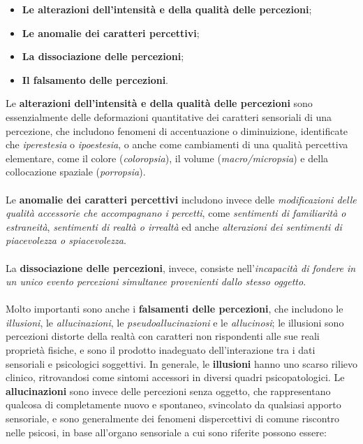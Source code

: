 \begin{itemize}
\item
  \textbf{Le alterazioni dell'intensità e della qualità delle
  percezioni};
\item
  \textbf{Le anomalie dei caratteri percettivi};
\item
  \textbf{La dissociazione delle percezioni};
\item
  \textbf{Il falsamento delle percezioni}.
\end{itemize}

Le \textbf{alterazioni dell'intensità e della qualità delle percezioni}
sono essenzialmente delle deformazioni quantitative dei caratteri
sensoriali di una percezione, che includono fenomeni di accentuazione o
diminuizione, identificate che \emph{iperestesia} o \emph{ipoestesia}, o
anche come cambiamenti di una qualità percettiva elementare, come il
colore (\emph{coloropsia}), il volume (\emph{macro/micropsia}) e della
collocazione spaziale (\emph{porropsia}).
\\\\
Le \textbf{anomalie dei caratteri percettivi} includono invece delle
\emph{modificazioni delle qualità accessorie che accompagnano i
percetti}, come \emph{sentimenti di familiarità o estraneità},
\emph{sentimenti di realtà o irrealtà} ed anche \emph{alterazioni dei
sentimenti di piacevolezza o spiacevolezza}.
\\\\
La \textbf{dissociazione delle percezioni}, invece, consiste
nell'\emph{incapacità di fondere in un unico evento percezioni
simultanee provenienti dallo stesso oggetto}.
\\\\
Molto importanti sono anche i \textbf{falsamenti delle percezioni}, che
includono le \emph{illusioni}, le \emph{allucinazioni}, le
\emph{pseudoallucinazioni} e le \emph{allucinosi}; le illusioni sono
percezioni distorte della realtà con caratteri non rispondenti alle sue
reali proprietà fisiche, e sono il prodotto inadeguato dell'interazione
tra i dati sensoriali e psicologici soggettivi. In generale, le
\textbf{illusioni} hanno uno scarso rilievo clinico, ritrovandosi come
sintomi accessori in diversi quadri psicopatologici. Le
\textbf{allucinazioni} sono invece delle percezioni senza oggetto, che
rappresentano qualcosa di completamente nuovo e spontaneo, svincolato da
qualsiasi apporto sensoriale, e sono generalmente dei fenomeni
dispercettivi di comune riscontro nelle psicosi, in base all'organo
sensoriale a cui sono riferite possono essere:

